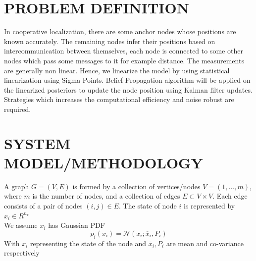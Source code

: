 \documentclass[12pt]{article}
\begin{document}
\section{PROBLEM DEFINITION}
In cooperative localization, there are some anchor nodes whose positions are known accurately. The remaining nodes infer their positions based on intercommunication between themselves, each node is connected to some other nodes which pass some messages to it for example distance. The measurements are generally non linear. Hence, we linearize the model by using statistical linearization using Sigma Points. Belief Propagation algorithm will be applied on the linearized posteriors to update the node position using Kalman filter updates. Strategies which increases the computational efficiency and noise robust are required.
\section{SYSTEM MODEL/METHODOLOGY}
A graph $G=(V,E)$ is formed by a collection of vertices/nodes $V=(1,...,m)$, where $m$ is the number of nodes, and a collection of edges $E⊂V×V$. Each edge consists of a pair of nodes $(i,j) ∈ E$. The state of node $i$ is represented by $x_i∈R^{n_x}$\\

We assume $x_{i}$  has Gaussian PDF\\

 \begin{equation}
p_{i}(x_{i}) =\mathcal {N}\left(x_{i};\overline{x}_{i},P_{i}\right)
\end{equation}
With $x_{i}$ representing the state of the node and  $\overline{x}_{i},P_{i}$ are mean and co-variance respectively\\
\end{document}
